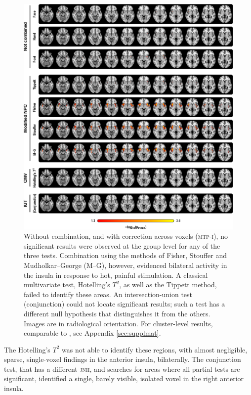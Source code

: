 \begin{figure}[p]
\begin{center}
\centerline{\includegraphics{images/pain.eps}}
\end{center}
\vspace{-9mm}
\caption[Results of the example pain study.]{Without combination, and with correction across voxels (\textsc{mtp-i}), no significant results were observed at the group level for any of the three tests. Combination using the methods of Fisher, Stouffer and Mudholkar--George (M--G), however, evidenced bilateral activity in the insula in response to hot, painful stimulation. A classical multivariate test, Hotelling's $T^2$, as well as the Tippett method, failed to identify these areas. An intersection-union test (conjunction) could not locate significant results; such a test has a different null hypothesis that distinguishes it from the others. Images are in radiological orientation. For cluster-level results, comparable to \citet{Brooks2005}, see Appendix \ref{sec:supplmat}.}
\label{fig:comb:pain}
\end{figure}

The Hotelling's $T^2$ was not able to identify these regions, with almost negligible, sparse, single-voxel findings in the anterior insula, bilaterally. The conjunction test, that has a different \textsc{jnh}, and searches for areas where all partial tests are significant, identified a single, barely visible, isolated voxel in the right anterior insula.

